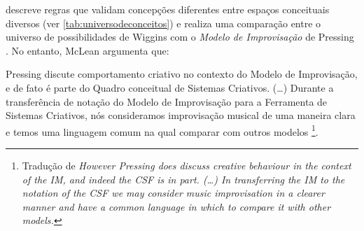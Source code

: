  descreve regras que validam concepções diferentes entre espaços conceituais diversos (ver \autoref{tab:universodeconceitos}) e realiza uma comparação entre o universo de possibilidades de Wiggins com o \emph{Modelo de Improvisação} de Pressing . No entanto, McLean argumenta que:

\begin{citacao}
Pressing discute comportamento criativo no contexto do Modelo de Improvisação, e de fato é parte do Quadro conceitual de Sistemas Criativos. (\ldots) Durante a transferência de notação do Modelo de Improvisação para a Ferramenta de Sistemas Criativos, nós consideramos improvisação musical de uma maneira clara e temos uma linguagem comum na qual comparar com outros modelos \footnote{Tradução de \emph{However Pressing does discuss creative behaviour in the context of the IM, and indeed the CSF is in part. (\ldots) In transferring the IM to the notation of the CSF we may consider music improvisation in a clearer manner and have a common language in which to compare it with other models.}}.
\end{citacao}

\newpage

